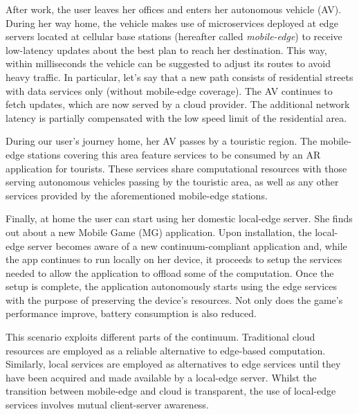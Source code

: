 After work, the user leaves her offices and enters her autonomous vehicle (AV). During her way home, the vehicle makes use of microservices deployed at edge servers located at cellular base stations (hereafter called \textit{mobile-edge}) to receive low-latency updates about the best plan to reach her destination. This way, within milliseconds the vehicle can be suggested to adjust its routes to avoid heavy traffic. In particular, let's say that a new path consists of residential streets with data services only (without mobile-edge coverage). The AV continues to fetch updates, which are now served by a cloud provider. The additional network latency is partially compensated with the low speed limit of the residential area.

During our user's journey home, her AV passes by a touristic region. The mobile-edge stations covering this area feature services to be consumed by an AR application for tourists. These services share computational resources with those serving autonomous vehicles passing by the touristic area, as well as any other services provided by the aforementioned mobile-edge stations.

Finally, at home the user can start using her domestic local-edge server. She finds out about a new Mobile Game (MG) application. Upon installation, the local-edge server becomes aware of a new continuum-compliant application and, while the app continues to run locally on her device, it proceeds to setup the services needed to allow the application to offload some of the computation. Once the setup is complete, the application autonomously starts using the edge services with the purpose of preserving the device's resources. Not only does the game's performance improve, battery consumption is also reduced.  

This scenario exploits different parts of the continuum. Traditional cloud resources are employed as a reliable alternative to edge-based computation. Similarly, local services are employed as alternatives to edge services until they have been acquired and made available by a local-edge server. Whilst the transition between mobile-edge and cloud is transparent, the use of local-edge services involves mutual client-server awareness.


